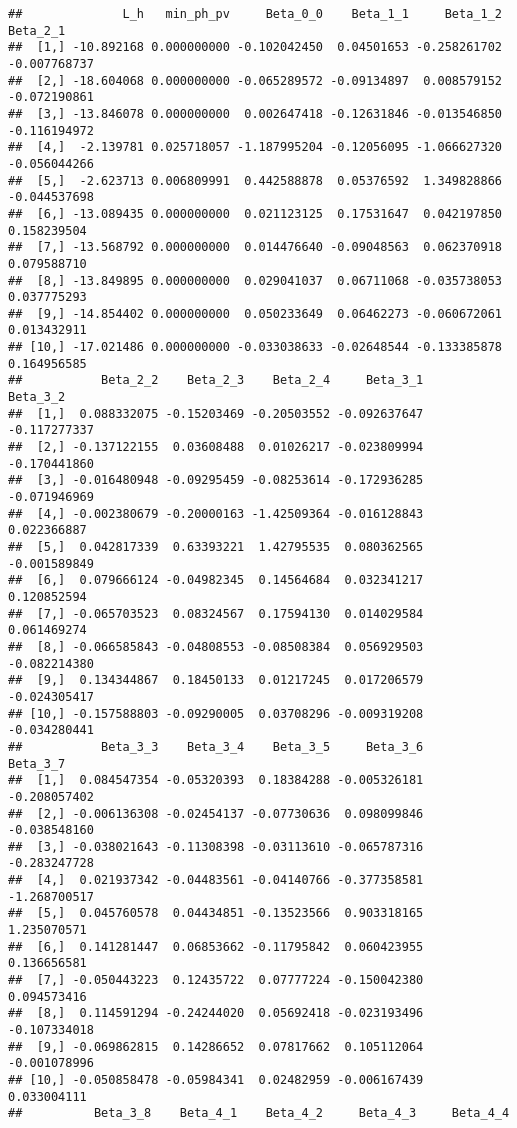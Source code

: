 \documentclass[
]{article}
\begin{document}
\begin{verbatim}
##              L_h   min_ph_pv     Beta_0_0    Beta_1_1     Beta_1_2     Beta_2_1
##  [1,] -10.892168 0.000000000 -0.102042450  0.04501653 -0.258261702 -0.007768737
##  [2,] -18.604068 0.000000000 -0.065289572 -0.09134897  0.008579152 -0.072190861
##  [3,] -13.846078 0.000000000  0.002647418 -0.12631846 -0.013546850 -0.116194972
##  [4,]  -2.139781 0.025718057 -1.187995204 -0.12056095 -1.066627320 -0.056044266
##  [5,]  -2.623713 0.006809991  0.442588878  0.05376592  1.349828866 -0.044537698
##  [6,] -13.089435 0.000000000  0.021123125  0.17531647  0.042197850  0.158239504
##  [7,] -13.568792 0.000000000  0.014476640 -0.09048563  0.062370918  0.079588710
##  [8,] -13.849895 0.000000000  0.029041037  0.06711068 -0.035738053  0.037775293
##  [9,] -14.854402 0.000000000  0.050233649  0.06462273 -0.060672061  0.013432911
## [10,] -17.021486 0.000000000 -0.033038633 -0.02648544 -0.133385878  0.164956585
##           Beta_2_2    Beta_2_3    Beta_2_4     Beta_3_1     Beta_3_2
##  [1,]  0.088332075 -0.15203469 -0.20503552 -0.092637647 -0.117277337
##  [2,] -0.137122155  0.03608488  0.01026217 -0.023809994 -0.170441860
##  [3,] -0.016480948 -0.09295459 -0.08253614 -0.172936285 -0.071946969
##  [4,] -0.002380679 -0.20000163 -1.42509364 -0.016128843  0.022366887
##  [5,]  0.042817339  0.63393221  1.42795535  0.080362565 -0.001589849
##  [6,]  0.079666124 -0.04982345  0.14564684  0.032341217  0.120852594
##  [7,] -0.065703523  0.08324567  0.17594130  0.014029584  0.061469274
##  [8,] -0.066585843 -0.04808553 -0.08508384  0.056929503 -0.082214380
##  [9,]  0.134344867  0.18450133  0.01217245  0.017206579 -0.024305417
## [10,] -0.157588803 -0.09290005  0.03708296 -0.009319208 -0.034280441
##           Beta_3_3    Beta_3_4    Beta_3_5     Beta_3_6     Beta_3_7
##  [1,]  0.084547354 -0.05320393  0.18384288 -0.005326181 -0.208057402
##  [2,] -0.006136308 -0.02454137 -0.07730636  0.098099846 -0.038548160
##  [3,] -0.038021643 -0.11308398 -0.03113610 -0.065787316 -0.283247728
##  [4,]  0.021937342 -0.04483561 -0.04140766 -0.377358581 -1.268700517
##  [5,]  0.045760578  0.04434851 -0.13523566  0.903318165  1.235070571
##  [6,]  0.141281447  0.06853662 -0.11795842  0.060423955  0.136656581
##  [7,] -0.050443223  0.12435722  0.07777224 -0.150042380  0.094573416
##  [8,]  0.114591294 -0.24244020  0.05692418 -0.023193496 -0.107334018
##  [9,] -0.069862815  0.14286652  0.07817662  0.105112064 -0.001078996
## [10,] -0.050858478 -0.05984341  0.02482959 -0.006167439  0.033004111
##          Beta_3_8    Beta_4_1    Beta_4_2     Beta_4_3     Beta_4_4

\end{verbatim}
\end{document}
